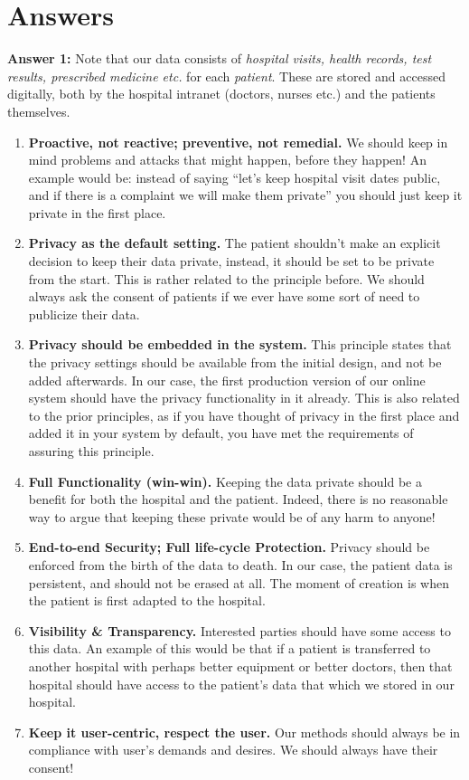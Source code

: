 \documentclass[12pt,reqno]{amsart}
\begin{document}
\section{Answers}
\textbf{Answer 1:} Note that our data consists of \textit{hospital visits, health records, test results, prescribed medicine etc.} for each \textit{patient}. These are stored and accessed digitally, both by the hospital intranet (doctors, nurses etc.) and the patients themselves. 
\begin{enumerate}
	\item \textbf{Proactive, not reactive; preventive, not remedial.} We should keep in mind problems and attacks that might happen, before they happen! An example would be: instead of saying ``let's keep hospital visit dates public, and if there is a complaint we will make them private'' you should just keep it private in the first place.
	\item \textbf{Privacy as the default setting.} The patient shouldn't make an explicit decision to keep their data private, instead, it should be set to be private from the start. This is rather related to the principle before. We should always ask the consent of patients if we ever have some sort of need to publicize their data.
	\item \textbf{Privacy should be embedded in the system.} This principle states that the privacy settings should be available from the initial design, and not be added afterwards. In our case, the first production version of our online system should have the privacy functionality in it already. This is also related to the prior principles, as if you have thought of privacy in the first place and added it in your system by default, you have met the requirements of assuring this principle.
	\item \textbf{Full Functionality (win-win).} Keeping the data private should be a benefit for both the hospital and the patient. Indeed, there is no reasonable way to argue that keeping these private would be of any harm to anyone!
	\item \textbf{End-to-end Security; Full life-cycle Protection.} Privacy should be enforced from the birth of the data to death. In our case, the patient data is persistent, and should not be erased at all. The moment of creation is when the patient is first adapted to the hospital.
	\item \textbf{Visibility \& Transparency.} Interested parties should have some access to this data. An example of this would be that if a patient is transferred to another hospital with perhaps better equipment or better doctors, then that hospital should have access to the patient's data that which we stored in our hospital. 
	\item \textbf{Keep it user-centric, respect the user.} Our methods should always be in compliance with user's demands and desires. We should always have their consent!
\end{enumerate}
\end{document}
